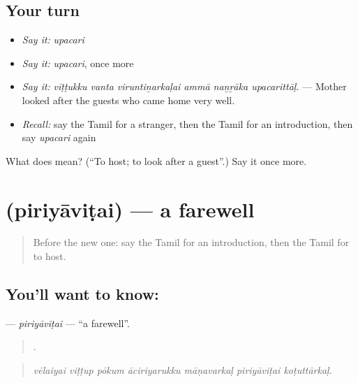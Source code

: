 \subsection*{Your turn}
\begin{itemize}
\raggedright
  \item \emph{Say it:} \emph{upacari}
  \item \emph{Say it:} \emph{upacari}, once more
  \item \emph{Say it:} \emph{vīṭṭukku vanta viruntiṉarkaḷai ammā naṉṟāka upacarittāḷ.} — Mother looked after the guests who came home very well.
  \item \emph{Recall:} say the Tamil for a stranger, then the Tamil for an introduction, then say \emph{upacari} again
\end{itemize}

\begin{tcolorbox}[breakable,colback=teal!4,colframe=teal!35!black,title={Before you move on}]
What does  mean? (\textquotedblleft{}To host; to look after a guest\textquotedblright{}.) Say it once more.
\end{tcolorbox}
\section[\texorpdfstring{\ta{பிரியாவிடை} (piriyāviṭai)}{பிரியாவிடை (piriyāviṭai)}]{ (piriyāviṭai) — a farewell}

\label{lesson:TA-C503-piriyavitai}



\begin{quote}
Before the new one: say the Tamil for an introduction, then the Tamil for to host.
\end{quote}

\subsection*{You'll want to know: }
\textbf{} — \emph{piriyāviṭai} — \textquotedblleft{}a farewell\textquotedblright{}.

\begin{quote}
      .
\end{quote}

\begin{quote}
\emph{vēlaiyai viṭṭup pōkum āciriyarukku māṇavarkaḷ piriyāviṭai koṭuttārkaḷ.}
\end{quote}

